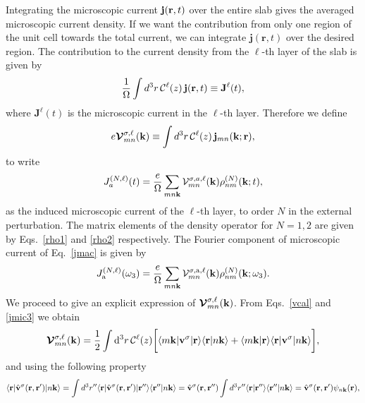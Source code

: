 \documentclass[floatfix,prb,aps,superscriptaddress,11pt,preprint,letterpaper]{revtex4}
\begin{document}
Integrating the microscopic current $\mathbf{j}(\mathbf{r},t)$ over
the entire slab gives the averaged microscopic current density. 
If we want the contribution from only one region of the unit cell 
towards the total current, we can integrate $\mathbf{j}({\mathbf r},t)$ 
over the desired region. The contribution to the current density from the
$\ell$-th layer of the slab is given by
\begin{equation}\label{jsz}
\frac{1}{\Omega}\int d^3r\, {\mathbf{\cal C}}^\ell(z)\, \mathbf{j}(\mathbf{r},t)
 \equiv \mathbf{J}^{\ell}(t),
\end{equation}
where $\mathbf{J}^{\ell}(t)$ is the microscopic current in the
$\ell$-th layer.
Therefore we define
\begin{equation}\label{vcal}
e{\boldsymbol{\mathcal{V}}}^{\sigma,\ell}_{mn}(\mathbf{k})
\equiv
\int d^3r\, {\mathbf{\cal C}}^\ell(z)\,\mathbf{j}_{mn}({\mathbf{k}};\mathbf{r}),
\end{equation}
to write
\begin{equation}\label{jmac}
J_a^{(N,\ell)}(t)=\frac{e}{\Omega}
\sum_{mn\mathbf{k}}
\mathcal{V}^{\sigma,a,\ell}_{mn}(\mathbf{k})
\rho^{(N)}_{nm}(\mathbf{k};t),
\end{equation}
as the induced microscopic current of the $\ell$-th layer, to order $N$ 
in the external perturbation. The matrix elements of the 
density operator for $N=1,2$ are given by Eqs.~\eqref{rho1} and
\eqref{rho2} respectively. 
The Fourier component of microscopic current of Eq.~\eqref{jmac} is given by
\begin{equation}\label{jmac2}
J_{\mathrm{a}}^{(N,\ell)}(\omega_3)=\frac{e}{\Omega}
\sum_{mn\mathbf{k}}
{\mathbf{\cal V}}^{\sigma,\mathrm{a},\ell}_{mn}(\mathbf{k})
\rho^{(N)}_{nm}(\mathbf{k};\omega_3)
.
\end{equation}
We proceed to give an explicit expression of
$\boldsymbol{\mathcal{\cal V}}^{\sigma,\ell}_{mn}(\mathbf{k})$.
From
Eqs.~\eqref{vcal} and \eqref{jmic3} we obtain
\begin{equation}\label{intj}
{\boldsymbol{\mathcal{V}}}^{\sigma,\ell}_{mn}({\mathbf k})=
\frac{1}{2}
\int \mathrm{d}^3 r\,
 {\mathbf{\cal C}}^\ell(z)
\bigg[
\langle m\mathbf{k}|\mathbf{v}^\sigma | \mathbf{r}\rangle
\langle \mathbf{r} | n \mathbf k \rangle +
\langle m\mathbf{k} | \mathbf{r}\rangle
\langle \mathbf{r} | \mathbf{v}^\sigma | n \mathbf k \rangle\bigg]
,
\end{equation}  
and using the following property
\begin{equation}\label{nl.2}
\langle \mathbf{r} | \hat{\mathbf{v}}^\sigma(\mathbf{r},\mathbf{r}')| n\mathbf{k} \rangle
=\int d^3 r'' \langle \mathbf{r} |\hat{\mathbf{v}}^\sigma(\mathbf{r},\mathbf{r}')| \mathbf{r}'' \rangle
\langle {\mathbf{r}''} | {n\mathbf{k}} \rangle
=\hat{\mathbf{v}}^\sigma(\mathbf{r},\mathbf{r}'')
\int d^3 r'' \langle {\mathbf{r}} | {\mathbf{r}''} \rangle
\langle {\mathbf{r}''} | {n\mathbf{k}} \rangle
=\hat{\mathbf{v}}^\sigma(\mathbf{r},\mathbf{r}')
\psi_{n\mathbf{k}}(\mathbf{r})
,
\end{equation}
\end{document}
